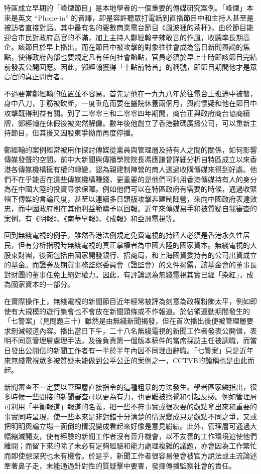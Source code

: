 特區成立早期的「峰煙節目」是本地學者的一個重要的傳媒研究案例。「峰煙」本來是英文 “Phone-in” 的音譯，即是容許聽眾打電話到直播節目中和主持人甚至是被訪者直接對話。其中最有名的要數商業電台節目《風波裡的茶杯》。由於節目能迎合市民對政府高官的不滿，加上主持人鄭經翰辛辣敢言的作風，收聽率長期高企。該節目於早上播出，而在節目中被攻擊的對象往往會成為當日新聞輿論的焦點，使得政府內部也要規定凡有任何社會熱點，官員必須於早上十時即該節目完結前發表公開回應。因此，鄭經翰獲得「十點前特首」的稱號，即節目期間他才是眾高官的真正問責者。

不過要當鄭經翰的位置並不容易。首先是他在一九九八年於往電台上班途中被襲，身中八刀，手筋被砍斷，一度垂危而要在醫院休養兩個月，輿論懷疑和他在節目中攻擊既得利益有關。到了二零零三和二零零四年期間，商台正與政府商台協商續牌，鄭經翰在休假後被突然解僱。數年後他創立了香港數碼廣播公司，可以重新主持節目，但其後又因股東爭拗而再度停播。

鄭經翰的案例經常被用作探討傳媒從業員與管理層及持有人之間的關係，如何影響傳媒發聲的空間。前中大新聞與傳播學院院長馮應謙曾詳細分析自特區成立以來香港各傳媒機構擁有權的轉變，認為親建制陣營的商人透過收購傳媒來得到好處。他們不在乎能否在這些傳媒機構賺錢，更重要的是他們可利用香港傳媒持有人的身分為在中國大陸的投資尋求保障。例如他們可以在特區政府有需要的時候，通過收緊轄下傳媒的言論尺度，甚至以連續多日頭版攻擊非建制陣營，來向中國政府表達效忠，而中國政府則在其他利益範疇予以回報。近年來傳媒易手和被質疑自我審查的案例，有《明報》、《南華早報》、《成報》和亞洲電視等。

回到無綫電視的例子，雖然香港法例規定免費電視的持牌人必須是香港永久性居民，但有分析指現時無綫電視的真正掌權者為中國大陸的國家資本。無綫電視的大股東財團，後面包括由國家開發銀行、招商局，和上海國資委持有的公司出資成立的基金。而證券及期貨事務監察委員會（證監會）的文件揭露，該基金會的董事長對財團的董事任免上絕對權力。因此，有評論認為無綫電視其實已經「染紅」，成為國家資本的一部分。

在實際操作上，無綫電視的新聞節目近年經常被評為刻意為政權粉飾太平，例如即使有大規模的遊行集會也不會放在新聞頭條或不作報道。於佔領運動期間發生的「七警案」（見問題三十）雖然是由無綫新聞揭發，但在首次播出後便被管理層要求刪減報道內容。播出當日下午，二十八名無綫電視的新聞工作者發表公開信，表明不同意管理層處理手法。及後負責第一個版本稿件的當席採訪主任被調職，而當日發出公開信的新聞工作者有一半於半年內因不同理由辭職。「七警案」只是近年來無綫電視眾多被質疑未能做到公平公正的案例之一，CCTVB的謔稱也是由此而起。

新聞審查不一定要以管理層直接指令的這種粗暴的方法發生。學者區家麟指出，很多時候一些間接的新聞審查可以更為有力，也更難被察覺和引起反感。例如管理層可利用「平衡報道」報道的名義，把一些不符事實或很次要的觀點拿出來和重要的事實同時呈現，使一些本來是非對錯十分清楚的情況變成只是觀點不同之爭，又或把明明輿論立場一面倒的情況變成看起來好像是意見紛紜。此外，管理層可通過大幅縮減開支，使有經驗的新聞工作者沒有晉升機會，以不友善的工作環境迫使他們離開；而留下來的除了未必有足夠經驗和能力處理複雜的議題，亦會因為工作繁忙而即使想深究也未有機會。於是乎，新聞工作者很容易便會被官方說法或主流論述牽著鼻子走，未能通過針對性的質疑擊中要害，發揮傳播監察社會的責任。

